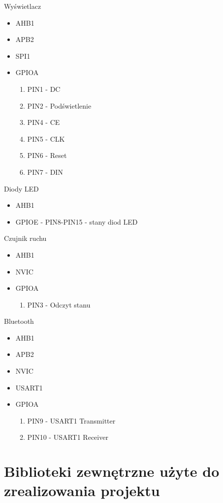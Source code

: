 \documentclass{article}
\begin{document}
Wyświetlacz
\begin{itemize}
    \item AHB1
    \item APB2
    \item SPI1
    \item GPIOA
        \begin{enumerate}
            \item PIN1 - DC
            \item PIN2 - Podświetlenie
            \item PIN4 - CE
            \item PIN5 - CLK
            \item PIN6 - Reset
            \item PIN7 - DIN
        \end{enumerate}
\end{itemize}

Diody LED
\begin{itemize}
    \item AHB1
    \item GPIOE - PIN8-PIN15 - stany diod LED
\end{itemize}

Czujnik ruchu
\begin{itemize}
    \item AHB1
    \item NVIC
    \item GPIOA
        \begin{enumerate}
            \item PIN3 - Odczyt stanu
        \end{enumerate}
\end{itemize}

Bluetooth
\begin{itemize}
    \item AHB1
    \item APB2
    \item NVIC
    \item USART1
    \item GPIOA
        \begin{enumerate}
            \item PIN9 - USART1 Transmitter
            \item PIN10 - USART1 Receiver
        \end{enumerate}
\end{itemize}

\section{Biblioteki zewnętrzne użyte do zrealizowania projektu}
\end{document}
